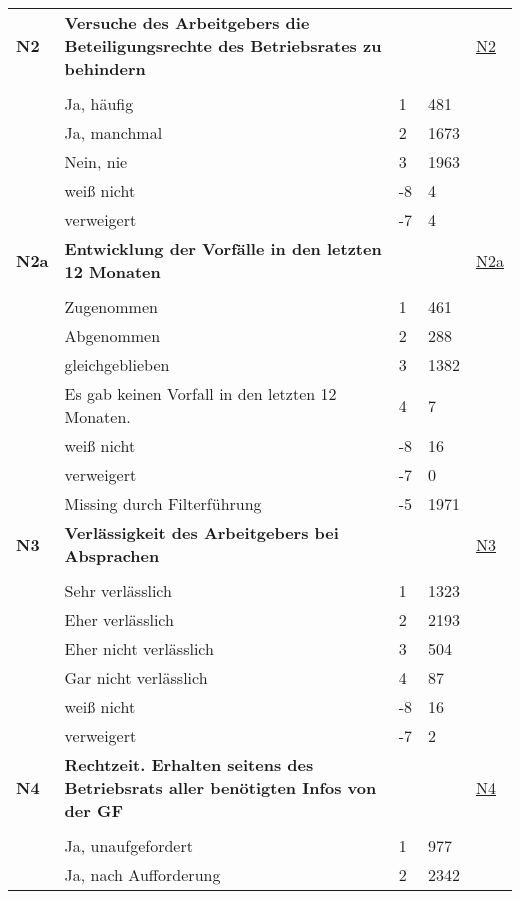 \begin{longtable}{| L{2.5cm} | L{8.25cm}| C{1.5cm} | R{1.25cm} | C{2.25cm} |  }
   \midrule
\textbf{N2}\label{var:suf:N2} & \textbf{Versuche des Arbeitgebers die Beteiligungsrechte des Betriebsrates zu behindern} &  &  & \hyperref[N2]{N2} \\ 
   &  &  &  &  \\ 
   & Ja, häufig & 1 & 481 &  \\ 
   & Ja, manchmal & 2 & 1673 &  \\ 
   & Nein, nie & 3 & 1963 &  \\ 
   & weiß nicht & -8 & 4 &  \\ 
   & verweigert & -7 & 4 &  \\ 
   \midrule
\textbf{N2a}\label{var:suf:N2a} & \textbf{Entwicklung der Vorfälle in den letzten 12 Monaten} &  &  & \hyperref[N2a]{N2a} \\ 
   &  &  &  &  \\ 
   & Zugenommen & 1 & 461 &  \\ 
   & Abgenommen & 2 & 288 &  \\ 
   & gleichgeblieben & 3 & 1382 &  \\ 
   & Es gab keinen Vorfall in den letzten 12 Monaten. & 4 & 7 &  \\ 
   & weiß nicht & -8 & 16 &  \\ 
   & verweigert & -7 & 0 &  \\ 
   & Missing durch Filterführung & -5 & 1971 &  \\ 
   \midrule
\textbf{N3}\label{var:suf:N3} & \textbf{Verlässigkeit des Arbeitgebers bei Absprachen} &  &  & \hyperref[N3]{N3} \\ 
   &  &  &  &  \\ 
   & Sehr verlässlich & 1 & 1323 &  \\ 
   & Eher verlässlich & 2 & 2193 &  \\ 
   & Eher nicht verlässlich & 3 & 504 &  \\ 
   & Gar nicht verlässlich & 4 & 87 &  \\ 
   & weiß nicht & -8 & 16 &  \\ 
   & verweigert & -7 & 2 &  \\ 
   \midrule
\textbf{N4}\label{var:suf:N4} & \textbf{Rechtzeit. Erhalten seitens des Betriebsrats aller benötigten Infos von der GF} &  &  & \hyperref[N4]{N4} \\ 
   &  &  &  &  \\ 
   & Ja, unaufgefordert & 1 & 977 &  \\ 
   & Ja, nach Aufforderung & 2 & 2342 &  \\ 

\end{longtable}

